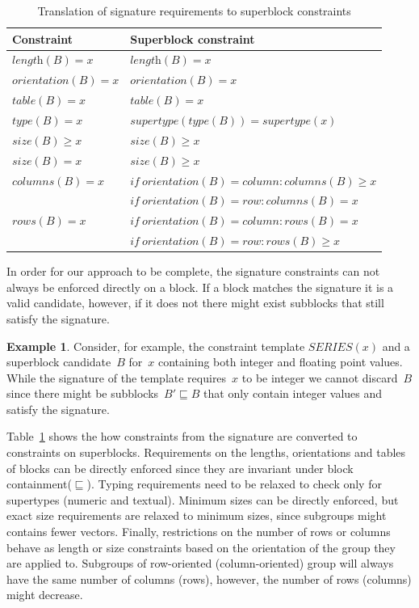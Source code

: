 \documentclass{IEEEtran}
\newcommand{\format}[1]{\textit{#1}\xspace}
\newcommand{\ecseries}[1]{\ensuremath{\textit{SERIES}(#1)}}
\newcommand{\plength}{\format{length}}
\newcommand{\psize}{\format{size}}
\newcommand{\ptype}{\format{type}}
\newcommand{\ptable}{\format{table}}
\newcommand{\por}{\format{orientation}}
\newcommand{\prows}{\format{rows}}
\newcommand{\pcols}{\format{columns}}
\theoremstyle{definition}
\newtheorem{example}{Example}
\begin{document}
\begin{table}[htb]
  \caption{Translation of signature requirements to superblock constraints}
  \label{tbl:translation}
  \begin{tabularx}{\linewidth}{lX}
    \textbf{Constraint} & \textbf{Superblock constraint} \\ \hline \hline
    $\plength(B) = x$ & $\plength(B) = x$ \\ \hline
    $\por(B) = x$ & $\por(B) = x$ \\\hline
    $\ptable(B) = x$ & $\ptable(B) = x$ \\ \hline
    $\ptype(B) = x$ & $\mathit{supertype}(\ptype(B)) = \mathit{supertype}(x)$ \\ \hline
    $\psize(B) \geq x$ & $\psize(B) \geq x$ \\ \hline
    $\psize(B) = x$ & $\psize(B) \geq x$ \\ \hline
    $\pcols(B) = x$ & $\mathit{if}~\por(B) = \mathit{column}: \pcols(B) \geq x$ \\ 
    & $\mathit{if}~\por(B) = \mathit{row}: \pcols(B) = x$ \\ \hline
    $\prows(B) = x$ & $\mathit{if}~\por(B) = \mathit{column}: \prows(B) = x$ \\ 
    & $\mathit{if}~\por(B) = \mathit{row}: \prows(B) \geq x$
  \end{tabularx}
\end{table}

In order for our approach to be complete, the signature constraints can not always be enforced directly on a block.
If a block matches the signature it is a valid candidate, however, if it does not there might exist subblocks that still satisfy the signature.
\begin{example}
  Consider, for example, the constraint template \ecseries{x} and a superblock candidate~$B$ for~$x$ containing both integer and floating point values.
  While the signature of the template requires~$x$ to be integer we cannot discard~$B$ since there might be subblocks~$B' \sqsubseteq B$ that only contain integer values and satisfy the signature.
\end{example}
Table~\ref{tbl:translation} shows the how constraints from the signature are converted to constraints on superblocks.
Requirements on the lengths, orientations and tables of blocks can be directly enforced since they are invariant under block containment($\sqsubseteq$).
Typing requirements need to be relaxed to check only for supertypes (numeric and textual).
Minimum sizes can be directly enforced, but exact size requirements are relaxed to minimum sizes, since subgroups might contains fewer vectors.
Finally, restrictions on the number of rows or columns behave as length or size constraints based on the orientation of the group they are applied to.
Subgroups of row-oriented (column-oriented) group will always have the same number of columns (rows), however, the number of rows (columns) might decrease.
\end{document}
